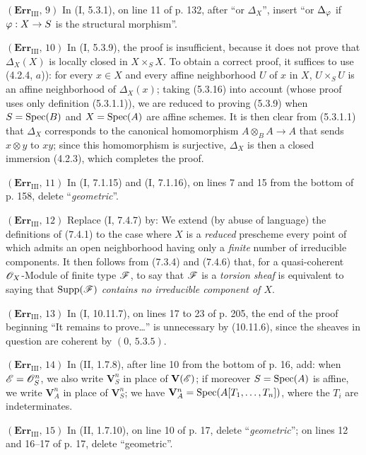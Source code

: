 \noindent\textbf{$(\mathbf{Err}_{\mathrm{III}},\,9)$} In (I, 5.3.1), on line
11 of p. 132, after ``or $\Delta_X$'', insert ``or $\Delta_\varphi$ if
$\varphi:X\to S$ is the structural morphism''.

\noindent\textbf{$(\mathbf{Err}_{\mathrm{III}},\,10)$} In (I, 5.3.9), the
proof is insufficient, because it does not prove that $\Delta_X(X)$ is
locally closed in $X\times_SX$. To obtain a correct proof, it suffices to use
(4.2.4, $a$)): for every $x\in X$ and every affine neighborhood $U$ of $x$ in
$X$, $U\times_SU$ is an affine neighborhood of $\Delta_X(x)$; taking (5.3.16)
into account (whose proof uses only definition (5.3.1.1)), we are reduced to
proving (5.3.9) when $S=\operatorname{Spec}(B)$ and $X=\operatorname{Spec}(A)$ are affine schemes. It is
then clear from (5.3.1.1) that $\Delta_X$ corresponds to the canonical
homomorphism $A\otimes_BA\to A$ that sends $x\otimes y$ to $xy$; since this
homomorphism is surjective, $\Delta_X$ is then a closed immersion (4.2.3),
which completes the proof.

\noindent\textbf{$(\mathbf{Err}_{\mathrm{III}},\,11)$} In (I, 7.1.15) and
(I, 7.1.16), on lines 7 and 15 from the bottom of p. 158, delete
``\emph{geometric}''.

\noindent\textbf{$(\mathbf{Err}_{\mathrm{III}},\,12)$} Replace (I, 7.4.7)
by: We extend (by abuse of language) the definitions of (7.4.1) to the case
where $X$ is a \emph{reduced} prescheme every point of which admits an open
neighborhood having only a \emph{finite} number of irreducible components. It
then follows from (7.3.4) and (7.4.6) that, for a quasi-coherent
$\mathscr{O}_X$-Module of finite type $\mathscr{F}$, to say that $\mathscr{F}$ is a
\emph{torsion sheaf} is equivalent to saying that $\operatorname{Supp}(\mathscr{F})$
\emph{contains no irreducible component of $X$}.

\noindent\textbf{$(\mathbf{Err}_{\mathrm{III}},\,13)$} In (I, 10.11.7), on
lines 17 to 23 of p. 205, the end of the proof beginning ``It remains to
prove\ldots{}'' is unnecessary by (10.11.6), since the sheaves in question
are coherent by $(0,\,5.3.5)$.

\noindent\textbf{$(\mathbf{Err}_{\mathrm{III}},\,14)$} In (II, 1.7.8), after
line 10 from the bottom of p. 16, add: when $\mathscr{E}=\mathscr{O}_S^n$, we also write
$\mathbf V_S^n$ in place of $\mathbf V(\mathscr{E})$; if moreover $S=\operatorname{Spec}(A)$ is
affine, we write $\mathbf V_A^n$ in place of $\mathbf V_S^n$; we have
$\mathbf V_A^n=\operatorname{Spec}(A[T_1,\ldots,T_n])$, where the $T_i$ are indeterminates.

\noindent\textbf{$(\mathbf{Err}_{\mathrm{III}},\,15)$} In (II, 1.7.10), on
line 10 of p. 17, delete ``\emph{geometric}''; on lines 12 and 16--17 of p.
17, delete ``geometric''.

